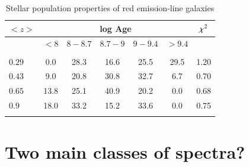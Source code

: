 \documentclass[referee]{aa}
\begin{document}
 
\begin{table}
   \renewcommand{\arraystretch}{0.9}
   \centering 
   \caption{Stellar population properties of red emission-line galaxies}
   \begin{tabular}{ l c c c c c c }
          $<z>$            & \multicolumn{5}{c}{log Age} &$\rm \chi^2$ \\ \hline
&  $<8$  & $8-8.7$ & $8.7-9$ & $9-9.4$ & $>9.4$   &  \\ \hline
& & & & & & \\
              
$0.29$            &    0.0 &   28.3 &          16.6  &        25.5  &         29.5  & 1.20                \\
$0.43$       &     9.0 &   20.8   &       30.8  &        32.7 &          6.7   & 0.70                \\
$0.65$        &    13.8 &   25.1   &       40.9  &        20.2 &          0.0   & 0.68                 \\
$0.9$         &    18.0 &   33.2   &       15.2  &        33.6  &         0.0   & 0.75                  \\
   \hline \hline
   \label{redpop}
   \end{tabular}
\end{table}


\section{Two main classes of spectra?}

\end{document}
